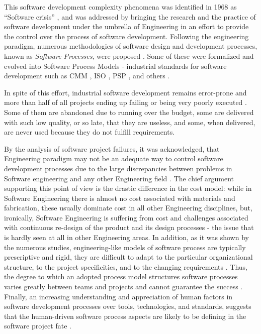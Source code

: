 This software development complexity phenomena was identified in 1968 as ``Software crisis'' 
\cite{naur_crisis_68}, and was addressed by bringing the research and the practice of software 
development under the umbrella of Engineering in an effort to provide the control over the process 
of software development. 
Following the engineering paradigm, numerous methodologies of software design and development 
processes, known as \textit{Software Processes}, were proposed \cite{citeulike:10002165}.
Some of these were formalized and evolved into Software Process Models - industrial standards for 
software development such as CMM \cite{citeulike:9962021}, ISO \cite{iso-standard}, 
PSP \cite{citeulike:8347315}, and others \cite{citeulike:5043104}. 

In spite of this effort, industrial software development remains error-prone and more than half of all 
projects ending up failing or being very poorly executed \cite{chaos2006}.
Some of them are abandoned due to running over the budget, some are delivered with such low quality, 
or so late, that they are useless, and some, when delivered, are never used because they do not 
fulfill requirements. 

By the analysis of software project failures, it was acknowledged, that Engineering paradigm 
may not be an adequate way to control software development processes due to the large discrepancies 
between problems in Software engineering and any other Engineering field 
\cite{citeulike:3729379} \cite{citeulike:5203446} \cite{citeulike:2207657}.
The chief argument supporting this point of view is the drastic difference in the cost model:
while in Software Engineering there is almost no cost associated with materials and fabrication, 
these usually dominate cost in all other Engineering disciplines, but, ironically, 
Software Engineering is suffering from cost and challenges associated with 
continuous re-design of the product and its design processes - the issue that is 
hardly seen at all in other Engineering areas. 
In addition, as it was shown by the numerous studies, engineering-like models of software process 
are typically prescriptive and rigid, they are difficult to adapt to the particular organizational 
structure, to the project specificities, and to the changing requirements \cite{citeulike:113403}. 
Thus, the degree to which an adopted process model structures software processes varies greatly 
between teams and projects and cannot guarantee the success \cite{sacchi_2001}. 
Finally, an increasing understanding and appreciation of human factors in software development 
processes over tools, technologies, and standards, suggests that the human-driven software 
process aspects are likely to be defining in the software project fate \cite{citeulike:6580825} 
\cite{citeulike:149387} \cite{1605185} \cite{citeulike:113403} \cite{citeulike:12743107}. 

